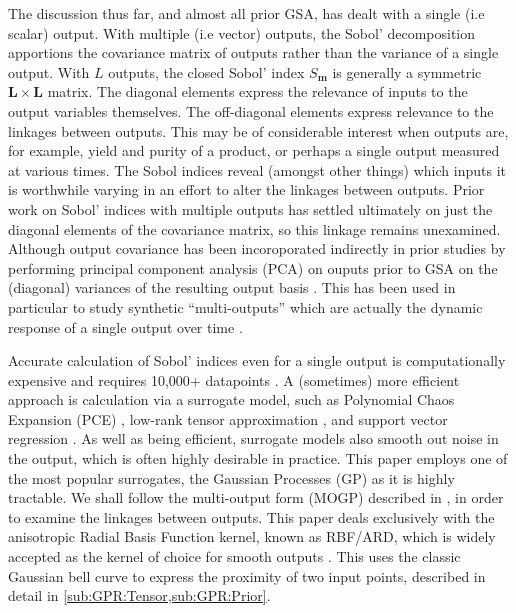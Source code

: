 \documentclass[preprint,12pt]{elsarticle}
\newcommand*{\x}{\times}
\newcommand*{\mi}[1]{\mathbf{#1}}
\begin{document}
    The discussion thus far, and almost all prior GSA, has dealt with a single (i.e scalar) output. With multiple (i.e vector) outputs, the Sobol' decomposition apportions the covariance matrix of outputs rather than the variance of a single output. With $L$ outputs, the closed Sobol' index $S_{\mi{m}}$ is generally a symmetric $\mi{L}\x \mi{L}$ matrix. The diagonal elements express the relevance of inputs to the output variables themselves. The off-diagonal elements express relevance to the linkages between outputs. This may be of considerable interest when outputs are, for example, yield and purity of a product, or perhaps a single output measured at various times. The Sobol indices reveal (amongst other things) which inputs it is worthwhile varying in an effort to alter the linkages between outputs. Prior work on Sobol' indices with multiple outputs \cite{Gamboa.etal2013,Xiao2017,GarciaCabrejo2014} has settled ultimately on just the diagonal elements of the covariance matrix, so this linkage remains unexamined. Although output covariance has been incoroporated indirectly in prior studies by performing principal component analysis (PCA) on ouputs prior to GSA on the (diagonal) variances of the resulting output basis \cite{Campbell2006}. This has been used in particular to study synthetic ``multi-outputs'' which are actually the dynamic response of a single output over time \cite{Lamboni2011, Zhang2020}.

    Accurate calculation of Sobol' indices even for a single output is computationally expensive and requires 10,000+ datapoints \cite{Lamoureux.etal2014}. A (sometimes) more efficient approach is calculation via a surrogate model, such as Polynomial Chaos Expansion (PCE) \cite{Ghanem.Spanos1997,Xiu.Karniadakis2002,Xiu2010}, low-rank tensor approximation \cite{Chevreuil.etal2015,Konakli.Sudret2016}, and support vector regression \cite{Cortes.Vapnik1995}. As well as being efficient, surrogate models also smooth out noise in the output, which is often highly desirable in practice. This paper employs one of the most popular surrogates, the Gaussian Processes (GP) \cite{Sacks.etal1989, Rasmussen.Williams2005} as it is highly tractable. We shall follow the multi-output form (MOGP) described in \cite{Alvarez.etal2011}, in order to examine the linkages between outputs.
    This paper deals exclusively with the anisotropic Radial Basis Function kernel, known as RBF/ARD, which is widely accepted as the kernel of choice for smooth outputs \cite{Rasmussen2016}. This uses the classic Gaussian bell curve to express the proximity of two input points, described in detail in \cref{sub:GPR:Tensor,sub:GPR:Prior}.
\end{document}
